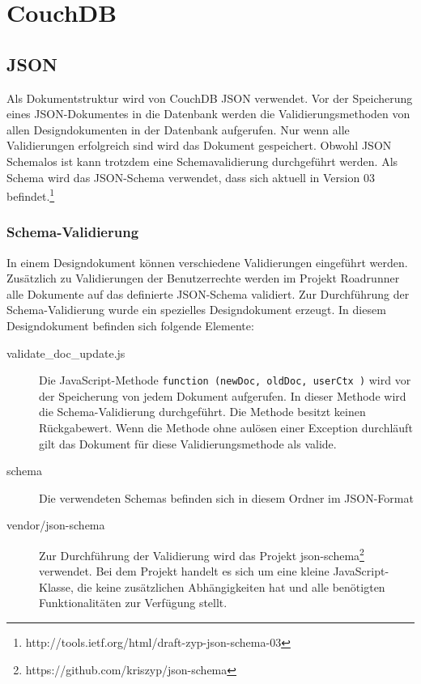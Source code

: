 \section{CouchDB}

\subsection{JSON}

Als Dokumentstruktur wird von CouchDB JSON verwendet. Vor der Speicherung eines JSON-Dokumentes in die Datenbank werden die Validierungsmethoden von allen Designdokumenten in der Datenbank aufgerufen. Nur wenn alle Validierungen erfolgreich sind wird das Dokument gespeichert. Obwohl JSON Schemalos ist kann trotzdem eine Schemavalidierung durchgeführt werden. Als Schema wird das JSON-Schema verwendet, dass sich aktuell in Version 03 befindet.\footnote{http://tools.ietf.org/html/draft-zyp-json-schema-03} 

\subsubsection{Schema-Validierung}

In einem Designdokument können verschiedene Validierungen eingeführt werden. Zusätzlich zu Validierungen der Benutzerrechte werden im Projekt Roadrunner alle Dokumente auf das definierte JSON-Schema validiert. 
Zur Durchführung der Schema-Validierung wurde ein spezielles Designdokument erzeugt. In diesem Designdokument befinden sich folgende Elemente:

\begin{description}
\item[validate\_doc\_update.js] Die JavaScript-Methode \texttt{function (newDoc, oldDoc, userCtx )} wird vor der Speicherung von jedem Dokument aufgerufen. In dieser Methode wird die Schema-Validierung durchgeführt. Die Methode besitzt keinen Rückgabewert. Wenn die Methode ohne aulösen einer Exception durchläuft gilt das Dokument für diese Validierungsmethode als valide.
\item[schema] Die verwendeten Schemas befinden sich in diesem Ordner im JSON-Format
\item[vendor/json-schema] Zur Durchführung der Validierung wird das Projekt json-schema\footnote{https://github.com/kriszyp/json-schema} verwendet. Bei dem Projekt handelt es sich um eine kleine JavaScript-Klasse, die keine zusätzlichen Abhängigkeiten hat und alle benötigten Funktionalitäten zur Verfügung stellt.
\end{description}

